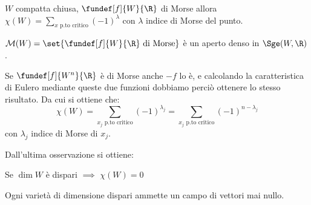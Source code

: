 \begin{teo}
$W$ compatta chiusa, $\fundef[f]{W}{\R}$ di Morse allora $\chi(W)=\sum_{\text{$x$ p.to critico}} (-1)^{\lambda}$ con $\lambda$ indice di Morse del punto.
\end{teo}

\begin{teo}
$\mathcal{M}(W) = \set{\fundef[f]{W}{\R}~\text{di Morse}}$ è un aperto denso in $\Sge(W,\R)$.
\end{teo}

\begin{oss}
Se $\fundef[f]{W^n}{\R}$ è di Morse anche $-f$ lo è, e calcolando la caratteristica di Eulero mediante queste due funzioni dobbiamo perciò ottenere lo stesso risultato. Da cui si ottiene che:
\begin{equation*}
\chi(W) = \sum_\text{$x_j$~p.to~critico} (-1)^{\lambda _j} = \sum_\text{$x_j$~p.to~critico} (-1)^{n - \lambda _j} 
\end{equation*}
con $\lambda _j$ indice di Morse di $x_j$.
\end{oss}

Dall'ultima osservazione si ottiene:
\begin{prop}
Se $\dim W$ è dispari $\implies$ $\chi(W) = 0$
\end{prop}

\begin{cor}
Ogni varietà di dimensione dispari ammette un campo di vettori mai nullo.
\end{cor}
